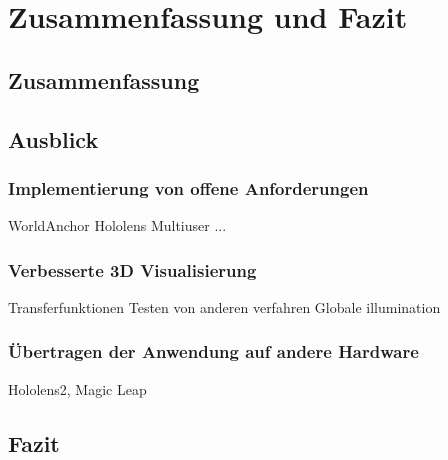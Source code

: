
\chapter{Zusammenfassung und Fazit}

\section{Zusammenfassung}

\section{Ausblick}

\subsection{Implementierung von offene  Anforderungen}
WorldAnchor Hololens
Multiuser
...

\subsection{Verbesserte 3D Visualisierung}
Transferfunktionen
Testen von anderen verfahren
Globale illumination

\subsection{Übertragen der Anwendung auf andere Hardware}
Hololens2, Magic Leap

\section{Fazit}
